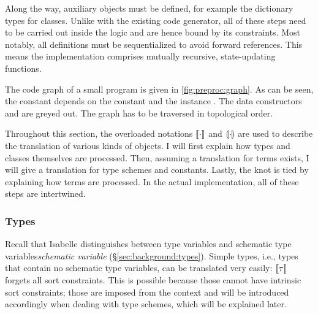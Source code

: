 
\noindent
Along the way, auxiliary objects must be defined, for example the dictionary types for classes.
Unlike with the existing code generator, all of these steps need to be carried out inside the logic and are hence bound by its constraints.
Most notably, all definitions must be sequentialized to avoid forward references.
This means the implementation comprises mutually recursive, state-updating functions.

The code graph of a small program is given in \cref{fig:preproc:graph}.
As can be seen, the constant  depends on the constant  and the instance .
The data constructors  and  are greyed out.
The graph has to be traversed in topological order.


\noindent
Throughout this section, the overloaded notations $\llbracket\cdot\rrbracket$ and $\llparenthesis\cdot\rrparenthesis$ are used to describe the translation of various kinds of objects.
I will first explain how types and classes themselves are processed.
Then, assuming a translation for terms exists, I will give a translation for type schemes and constants.
Lastly, the knot is tied by explaining how terms are processed.
In the actual implementation, all of these steps are intertwined.

\subsubsection{Types}

Recall that Isabelle distinguishes between type variables and schematic type variables\emph{schematic variable} (§\ref{sec:background:types}).
Simple types, i.e., types that contain no schematic type variables, can be translated very easily: $\llbracket\tau\rrbracket$ forgets all sort constraints.
This is possible because those cannot have intrinsic sort constraints; those are imposed from the context and will be introduced accordingly when dealing with type schemes, which will be explained later.

